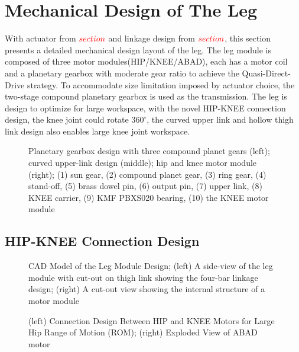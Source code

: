 

\section{Mechanical Design of The Leg}
\label{sec:LegDesign}

With actuator from $\color{red}section$ and linkage design from $\color{red}section$, this section presents a detailed mechanical design layout of the leg. The leg module is composed of three motor modules(HIP/KNEE/ABAD), each has a motor coil and a planetary gearbox with moderate gear ratio to achieve the Quasi-Direct-Drive\cite{20162016} strategy. To accommodate size limitation imposed by actuator choice, the two-stage compound planetary gearbox is used as the transmission. The leg is design to optimize for large workspace, with the novel HIP-KNEE connection design, the knee joint could rotate $360^{\circ}$, the curved upper link and hollow thigh link design also enables large knee joint workspace.
  
\begin{figure}
	\centering
	\caption{Planetary gearbox design with three compound planet gears (left); curved upper-link design (middle); hip and knee motor module (right); (1) sun gear, (2) compound planet gear, (3) ring gear, (4) stand-off, (5) brass dowel pin, (6) output pin, (7) upper link, (8) KNEE carrier, (9) KMF PBXS020 bearing, (10) the KNEE motor module}
	\label{fig:gearbox}
\end{figure}



\subsection{HIP-KNEE Connection Design}
\label{sec:Design4ROM}

\begin{figure}
	\centering
	\caption{CAD Model of the Leg Module Design; (left) A side-view of the leg module with cut-out on thigh link showing the four-bar linkage design; (right) A cut-out view showing the internal structure of a motor module}
	\label{fig:LegDesign}
\end{figure}
\begin{figure}
	\centering
	\caption{(left) Connection Design Between HIP and KNEE Motors for Large Hip Range of Motion (ROM); (right) Exploded View of ABAD motor}
	\label{fig:KMFbearings}
\end{figure}

